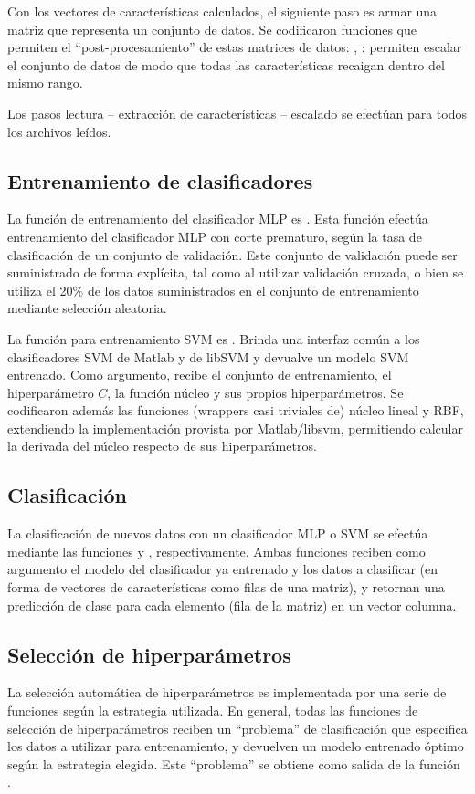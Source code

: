 \documentclass[12pt,bibliography=oldstyle,DIV=12,parskip=half-]{scrreprt}
\begin{document}
Con los vectores de características calculados, el siguiente paso es
armar una matriz que representa un conjunto de datos.  Se codificaron
funciones que permiten el ``post-procesamiento'' de estas matrices de
datos: , : permiten escalar el
conjunto de datos de modo que todas las características recaigan
dentro del mismo rango.

Los pasos lectura -- extracción de características --
escalado se efectúan para todos los archivos leídos.
%
%
\subsection{Entrenamiento de clasificadores}
%
La función de entrenamiento del clasificador MLP es
. Esta función efectúa entrenamiento del
clasificador MLP con corte prematuro, según la tasa de clasificación
de un conjunto de validación. Este conjunto de validación puede ser
suministrado de forma explícita, tal como al utilizar validación
cruzada, o bien se utiliza el 20\% de los datos suministrados en el
conjunto de entrenamiento mediante selección aleatoria.

La función para entrenamiento SVM es . Brinda una
interfaz común a los clasificadores SVM de Matlab y de libSVM y
devualve un modelo SVM entrenado.  Como argumento, recibe el conjunto
de entrenamiento, el hiperparámetro $C$, la función núcleo y sus
propios hiperparámetros.  Se codificaron además las funciones
(wrappers casi triviales de) núcleo lineal y RBF, extendiendo la
implementación provista por Matlab/libsvm, permitiendo calcular la
derivada del núcleo respecto de sus hiperparámetros.
%
%
\subsection{Clasificación}
%
La clasificación de nuevos datos con un clasificador MLP o SVM se
efectúa mediante las funciones  y
, respectivamente.  Ambas funciones reciben como
argumento el modelo del clasificador ya entrenado y los datos a
clasificar (en forma de vectores de características como filas de una
matriz), y retornan una predicción de clase para cada elemento (fila
de la matriz) en un vector columna.
%
%
\subsection{Selección de hiperparámetros}
%
La selección automática de hiperparámetros es implementada por una
serie de funciones según la estrategia utilizada. En general, todas
las funciones de selección de hiperparámetros reciben un ``problema''
de clasificación que especifica los datos a utilizar para
entrenamiento, y devuelven un modelo entrenado óptimo según la
estrategia elegida.  Este ``problema'' se obtiene como salida de la
función .
%
\end{document}
